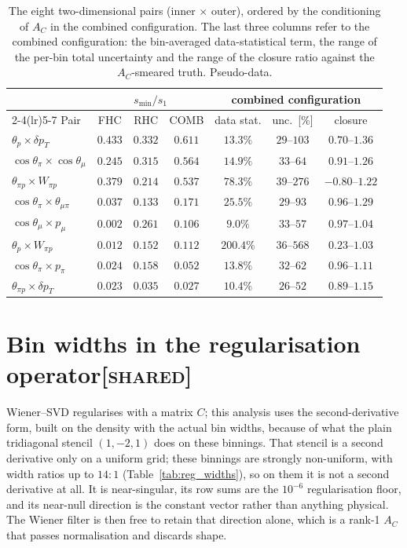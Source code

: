 \documentclass[11pt,a4paper]{article}
\newcommand{\scopetag}[1]{\hfill{\normalfont\small\textsc{[#1]}}}
\begin{document}
\begin{table}[H]
  \centering
  \caption{The eight two-dimensional pairs (inner $\times$ outer), ordered by the conditioning of
    $A_C$ in the combined configuration. The last three columns refer to the combined configuration:
    the bin-averaged data-statistical term, the range of the per-bin total uncertainty and the range of
    the closure ratio against the $A_C$-smeared truth. Pseudo-data.}
  \label{tab:2dextract}
  \small
  \begin{tabular}{lcccccc}
    \toprule
    & \multicolumn{3}{c}{$s_{\min}/s_1$} & \multicolumn{3}{c}{combined configuration} \\
    \cmidrule(lr){2-4}\cmidrule(lr){5-7}
    Pair & FHC & RHC & COMB & data stat. & unc.\ [\%] & closure \\
    \midrule
    $\theta_p\times\delta p_T$ & $0.433$ & $0.332$ & $\mathbf{0.611}$ & $13.3\%$ & $29$--$103$ & $0.70$--$1.36$ \\
    $\cos\theta_\pi\times\cos\theta_\mu$ & $0.245$ & $0.315$ & $\mathbf{0.564}$ & $14.9\%$ & $33$--$64$ & $0.91$--$1.26$ \\
    $\theta_{\pi p}\times W_{\pi p}$ & $0.379$ & $0.214$ & $0.537$ & $78.3\%$ & $39$--$276$ & $-0.80$--$1.22$ \\
    $\cos\theta_\pi\times\theta_{\mu\pi}$ & $0.037$ & $0.133$ & $0.171$ & $25.5\%$ & $29$--$93$ & $0.96$--$1.29$ \\
    $\cos\theta_\mu\times p_\mu$ & $0.002$ & $0.261$ & $0.106$ & $9.0\%$ & $33$--$57$ & $0.97$--$1.04$ \\
    $\theta_p\times W_{\pi p}$ & $0.012$ & $0.152$ & $0.112$ & $200.4\%$ & $36$--$568$ & $0.23$--$1.03$ \\
    $\cos\theta_\pi\times p_\pi$ & $0.024$ & $0.158$ & $0.052$ & $13.8\%$ & $32$--$62$ & $0.96$--$1.11$ \\
    $\theta_{\pi p}\times\delta p_T$ & $0.023$ & $0.035$ & $0.027$ & $10.4\%$ & $26$--$52$ & $0.89$--$1.15$ \\
    \bottomrule
  \end{tabular}
\end{table}

\section[Bin widths in the regularisation operator]{Bin widths in the regularisation operator\scopetag{shared}}
\label{sec:reg_widths}

Wiener--SVD regularises with a matrix $C$; this analysis uses the second-derivative form,
built on the density with the actual bin widths, because of what the plain tridiagonal
stencil $(1,-2,1)$ does on these binnings. That stencil is a second
derivative only on a uniform grid; these binnings are strongly non-uniform, with
width ratios up to $14{:}1$ (Table~\ref{tab:reg_widths}), so on them it is not a second
derivative at all. It is near-singular, its row sums are the $10^{-6}$ regularisation
floor, and its near-null direction is the constant vector rather than anything physical.
The Wiener filter is then free to retain that direction alone, which is a rank-1 $A_C$
that passes normalisation and discards shape.
\end{document}
